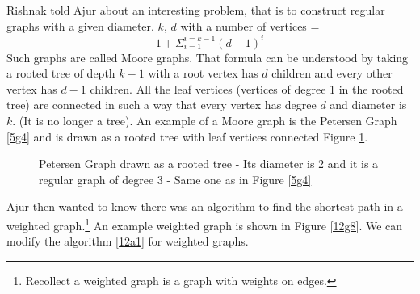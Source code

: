 Rishnak told Ajur about an interesting problem, that is to construct regular graphs with a given diameter. $k$, $d$ with a number of vertices = $$1+\Sigma_{i=1}^{i=k-1} (d-1)^i$$  Such graphs are called Moore graphs. That formula can be understood by taking a rooted tree of depth $k-1$ with a root vertex has $d$ children and every other vertex has $d-1$ children. All the leaf vertices (vertices of degree 1 in the rooted tree) are connected in such a way that every vertex has degree $d$ and diameter is $k$. (It is no longer a tree). An example of a Moore graph is the Petersen Graph \ref{5g4} and is drawn as a rooted tree with leaf vertices connected Figure \ref{12g7}.
\begin{figure}
\caption{ Petersen Graph drawn as a rooted tree - Its diameter is 2 and it is a regular graph of degree 3 - Same one as in Figure  \ref{5g4}}\label{12g7}
\end{figure}



Ajur then wanted to know there was an algorithm to find the shortest path in a weighted graph.\footnote{Recollect a weighted graph is a graph with weights on edges.} An example weighted graph is shown in Figure \ref{12g8}.
We can modify the algorithm \ref{12a1} for weighted graphs.

